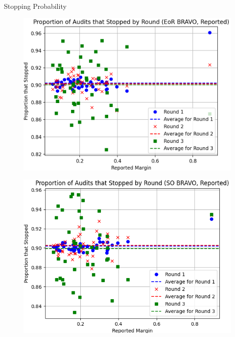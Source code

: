 \documentclass[final]{beamer}
\newcommand{\BRAVO}{\textsc{BRAVO}\xspace}
\newlength{\colwidth}
\begin{document}
\begin{frame}[t]
\begin{columns}[t]
\begin{column}{\colwidth}
\begin{block}{Stopping Probability}
\begin{figure}[h]
\begin{minipage}{.49\textwidth}
\begin{centering}
\includegraphics[width=1.0\textwidth]{eor_bravo_90perc_10^4_corrected/sprob_first_three_cropped.png}%
\label{fig:eor_bravo_sprob}
\end{centering}\end{minipage}
\begin{minipage}{.49\textwidth}
\begin{centering}
\includegraphics[width=1.0\textwidth]{so_bravo_90perc_10^4/sprob_first_three.png}%

\end{centering}
\end{minipage}
\end{figure}
\end{block}
\end{column}
\end{columns}
\end{frame}
\end{document}
